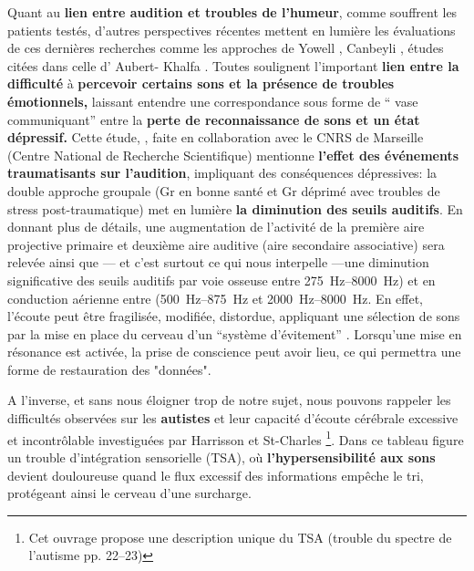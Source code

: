 Quant au \textbf{ lien entre audition et troubles de l'humeur}, comme souffrent
les patients testés, d'autres perspectives
récentes mettent en lumière les évaluations de ces dernières recherches  comme les approches de 
Yowell \autocite {Yowell}, %
 Canbeyli \autocite{Canbeyli},
études citées dans celle d' Aubert- Khalfa \autocite {affectiveDisorders}. Toutes soulignent
l'important\textbf{ lien entre la difficulté}
à \textbf {percevoir certains sons et la présence de troubles émotionnels,}
laissant entendre une correspondance sous forme de `` vase communiquant''
entre la \textbf {perte de reconnaissance de
sons et un état dépressif.}
Cette étude, \autocite{affectiveDisorders}, faite
   en collaboration avec
le CNRS de Marseille (Centre National de Recherche Scientifique)
 mentionne \textbf{l'effet des événements
traumatisants sur l'audition}, impliquant des conséquences dépressives:
la double approche groupale (Gr en bonne santé et Gr déprimé avec
troubles de stress post-traumatique) met en lumière \textbf{la diminution des
  seuils auditifs}.
En donnant plus de détails, une augmentation de l'activité de la
première aire projective primaire et deuxième aire auditive (aire
secondaire associative) sera relevée ainsi que --- et c'est surtout ce qui nous interpelle ---une 
diminution significative des
seuils auditifs par voie osseuse  entre
\SIrange{275}{8000}{\Hz}) et en conduction aérienne entre 
(\SIrange{500}{875}{\Hz} et  \SIrange{2000}{8000}{\Hz}.
En effet, l'écoute peut être fragilisée, modifiée, distordue, appliquant une sélection de sons par la mise en 
place du cerveau d'un \enquote{système d'évitement} \autocite {Kabat-Zinn}.
Lorsqu'une mise en résonance est activée, la prise de conscience peut avoir lieu, ce qui permettra une 
forme de restauration des "données".

A l'inverse, et sans nous éloigner trop de notre sujet, nous pouvons rappeler
les difficultés observées sur les
\textbf{autistes} et leur capacité d'écoute cérébrale excessive et
incontrôlable investiguées par Harrisson et St-Charles \autocite {harrisson_autisme_2017}\footnote{Cet ouvrage propose une description unique du TSA
   (trouble du spectre de l'autisme
   pp. 22--23)}. Dans ce tableau
 figure un trouble d'intégration sensorielle (TSA), où
 \textbf{l'hypersensibilité aux sons} devient douloureuse quand le flux excessif
 des
 informations empêche le tri, protégeant ainsi le cerveau d'une surcharge.

